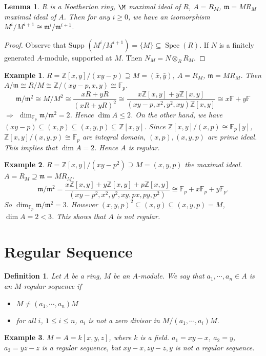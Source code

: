 \documentclass[cs4size]{article}
\newcommand{\su}{\subseteq}
\newcommand{\frm}{\mathfrak{m}}
\newcommand{\bb}{\mathbb}
\DeclareMathOperator{\Spec}{Spec}
\newtheorem{definition}{Definition}
\newtheorem{lem}{Lemma}
\newtheorem{ex}{Example}
\begin{document}
\begin{lem}
$R$ is a Noetherian ring, $\M$ maximal ideal of $R$, $A=R_M$, $\frm=MR_M$ maximal ideal of $A$. Then for any $i\geq 0$, we have an isomorphism $M^i/M^{i+1}\cong \frm^i/\frm^{i+1}$.
\end{lem}
\begin{proof}
Observe that $\text{Supp } (M^i/M^{i+1})=\{M\}\su \Spec(R)$. If $N$ is a finitely generated $A$-module, supported at $M$. Then $N_M=N\otimes_RR_M$.
\end{proof}
\begin{ex}
$R=\bb{Z}[x,y]/(xy-p)\supseteq M=(\bar{x},\bar{y})$, $A=R_M$, $\frm=MR_M$. Then $A/\frm\cong R/M\cong \bb{Z}/(xy-p,x,y)\cong \bb{F}_p$. \[\frm/\frm^2\cong M/M^2\cong \frac{xR+yR}{(xR+yR)^2}\cong \frac{x\bb{Z}[x,y]+y\bb{Z}[x,y]}{(xy-p,x^2,y^2,xy)\bb{Z}[x,y]}\cong x\bb{F}+y\bb{F}\]
$\Rightarrow$ $\dim_{\bb{F}_p}\frm/\frm^2=2$. Hence $\dim A\leq 2$. On the other hand, we have $(xy-p)\su (x,p)\su (x,y,p)\su\bb{Z}[x,y]$. Since $\bb{Z}[x,y]/(x,p)\cong \bb{F}_p[y]$, $\bb{Z}[x,y]/(x,y,p)\cong \bb{F}_p$ are integral domain, $(x,p),(x,y,p)$ are prime ideal. This implies that $\dim A=2$. Hence $A$ is regular.
\end{ex}

\begin{ex}
$R=\bb{Z}[x,y]/(xy-p^2)\supseteq M=(x,y,p)$ the maximal ideal. $A=R_M\supseteq \frm=MR_M$.
\[\frm/\frm^2=\frac{x\bb{Z}[x,y]+y\bb{Z}[x,y]+p\bb{Z}[x,y]}{(xy-p^2,x^2,y^2,xy,px,py,p^2)}\cong \bb{F}_p+x\bb{F}_p+y\bb{F}_p.\]
So $\dim_{\bb{F}_p}\frm/\frm^2=3.$ However $(x,y,p)^2\su(x,y)\su(x,y,p)=M$, $\dim A=2<3$. This shows that $A$ is not regular.
\end{ex}

\section{Regular Sequence}
\begin{definition}
Let $A$ be a ring, $M$ be an $A$-module. We say that $a_1,\cdots,a_n\in A$ is an $M$-regular sequence if
\begin{itemize}
\item $M\neq (a_1,\cdots,a_n)M$
\item for all $i$, $1\leq i\leq n$, $a_i$ is not a zero divisor in $M/(a_1,\cdots,a_i)M$.
\end{itemize}
\end{definition}
\begin{ex}
$M=A=k[x,y,z]$, where $k$ is a field. $a_1=xy-x$, $a_2=y$, $a_3=yz-z$ is a regular sequence, but $xy-x,zy-z,y$ is not a regular sequence.
\end{ex}
\end{document}
